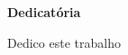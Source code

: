 \def\textoDedicatoria{
  Dedico este trabalho
}

\begin{dedicatoria}
  \textbf{Dedicatória}
  \vfill
  \hfill{}
  \parbox{6cm}{
    \begin{flushright}
      \textoDedicatoria\
    \end{flushright}
      }
\end{dedicatoria}